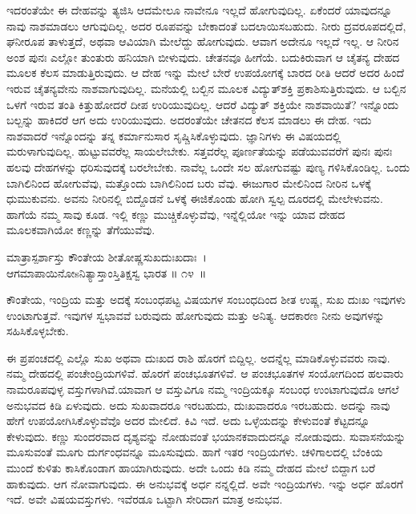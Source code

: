ಇದರಂತೆಯೇ ಈ ದೇಹವನ್ನು ತ್ಯಜಿಸಿ ಆದಮೇಲೂ ನಾವೇನೂ ಇಲ್ಲದೆ ಹೋಗುವುದಿಲ್ಲ. ಏಕೆಂದರೆ ಯಾವುದನ್ನೂ ನಾವು ನಾಶಮಾಡಲು ಆಗುವುದಿಲ್ಲ. ಅದರ ರೂಪವನ್ನು ಬೇಕಾದಂತೆ ಬದಲಾಯಿಸಬಹುದು. ನೀರು ದ್ರವರೂಪದಲ್ಲಿದೆ, ಘನೀರೂಪ ತಾಳುತ್ತದೆ, ಅಥವಾ ಆವಿಯಾಗಿ ಮೇಲೆದ್ದು ಹೋಗುವುದು. ಆವಾಗ ಅದೇನೂ ಇಲ್ಲದೆ ಇಲ್ಲ. ಆ ನೀರಿನ ಅಂಶ ಪುನಃ ಎಲ್ಲೋ ತುಂತುರು ಹನಿಯಾಗಿ ಬೀಳುವುದು. ಚೇತನವೂ ಹೀಗೆಯೆ. ಬದುಕಿರುವಾಗ ಆ ಚೈತನ್ಯ ದೇಹದ ಮೂಲಕ ಕೆಲಸ ಮಾಡುತ್ತಿರುವುದು. ಆ ದೇಹ ಇನ್ನು ಮೇಲೆ ಬೇರೆ ಉಪಯೋಗಕ್ಕೆ ಬಾರದ ರೀತಿ ಆದರೆ ಅದರ ಹಿಂದೆ ಇರುವ ಚೈತನ್ಯವೇನು ನಾಶವಾಗುವುದಿಲ್ಲ. ಮನೆಯಲ್ಲಿ ಬಲ್ಬಿನ ಮೂಲಕ ವಿದ್ಯುತ್​ಶಕ್ತಿ ಪ್ರಕಾಶಿಸುತ್ತಿರುವುದು. ಆ ಬಲ್ಬಿನ ಒಳಗೆ ಇರುವ ತಂತಿ ಕಿತ್ತುಹೋದರೆ ದೀಪ ಉರಿಯುವುದಿಲ್ಲ. ಆದರೆ ವಿದ್ಯುತ್ ಶಕ್ತಿಯೇ ನಾಶವಾಯಿತೆ? ಇನ್ನೊಂದು ಬಲ್ಬನ್ನು ಹಾಕಿದರೆ ಆಗ ಅದು ಉರಿಯುವುದು. ಅದರಂತೆಯೇ ಚೇತನದ ಕೆಲಸ ಮಾಡಲು ಈ ದೇಹ. ಇದು ನಾಶವಾದರೆ ಇನ್ನೊಂದನ್ನು ತನ್ನ ಕರ್ಮಾನುಸಾರ ಸೃಷ್ಚಿಸಿಕೊಳ್ಳುವುದು. ಜ್ಞಾನಿಗಳು ಈ ವಿಷಯದಲ್ಲಿ ಮರುಳಾಗುವುದಿಲ್ಲ. ಹುಟ್ಟುವವರೆಲ್ಲ ಸಾಯಲೇಬೇಕು. ಸತ್ತವರೆಲ್ಲ ಪೂರ್ಣತೆಯನ್ನು ಪಡೆಯುವವರೆಗೆ ಪುನಃ ಪುನಃ ಹಲವು ದೇಹಗಳನ್ನು ಧರಿಸುವುದಕ್ಕೆ ಬರಲೇಬೇಕು. ನಾವೆಲ್ಲ ಒಂದೇ ಸಲ ಹೋಗುವಷ್ಟು ಪುಣ್ಯ ಗಳಿಸಿಕೊಂಡಿಲ್ಲ. ಒಂದು ಬಾಗಿಲಿನಿಂದ ಹೋಗುವೆವು, ಮತ್ತೊಂದು ಬಾಗಿಲಿನಿಂದ ಬರು ವೆವು. ಈಜುಗಾರ ಮೇಲಿನಿಂದ ನೀರಿನ ಒಳಕ್ಕೆ ಧುಮುಕುವನು. ಅವನು ನೀರಿನಲ್ಲಿ ಬಿದ್ದೊಡನೆ ಒಳಕ್ಕೆ ಈಜಿಕೊಂಡು ಹೋಗಿ ಸ್ವಲ್ಪ ದೂರದಲ್ಲಿ ಮೇಲೇಳುವನು. ಹಾಗೆಯೆ ನಮ್ಮ ಸಾವು ಕೂಡ. ಇಲ್ಲಿ ಕಣ್ಣು ಮುಚ್ಚಿಕೊಳ್ಳುವೆವು, ಇನ್ನೆಲ್ಲಿಯೋ ಇನ್ನು ಯಾವ ದೇಹದ ಮೂಲಕವಾಗಿಯೋ ಕಣ್ಣನ್ನು ತೆಗೆಯುವೆವು.

\begin{shloka}
ಮಾತ್ರಾಸ್ಪರ್ಶಾಸ್ತು ಕೌಂತೇಯ ಶೀತೋಷ್ಣಸುಖದುಃಖದಾಃ~।\\ಆಗಮಾಪಾಯಿನೋsನಿತ್ಯಾಸ್ತಾಂಸ್ತಿತಿಕ್ಷಸ್ವ ಭಾರತ \hfill॥ ೧೪~॥
\end{shloka}

\begin{artha}
ಕೌಂತೇಯ, ಇಂದ್ರಿಯ ಮತ್ತು ಅದಕ್ಕೆ ಸಂಬಂಧಪಟ್ಟ ವಿಷಯಗಳ ಸಂಬಂಧದಿಂದ ಶೀತ ಉಷ್ಣ, ಸುಖ ದುಃಖ ಇವುಗಳು ಉಂಟಾಗುತ್ತವೆ. ಇವುಗಳ ಸ್ವಭಾವವೆ ಬರುವುದು ಹೋಗುವುದು ಮತ್ತು ಅನಿತ್ಯ. ಆದಕಾರಣ ನೀನು ಅವುಗಳನ್ನು ಸಹಿಸಿಕೊಳ್ಳಬೇಕು.
\end{artha}

ಈ ಪ್ರಪಂಚದಲ್ಲಿ ಎಲ್ಲೊ ಸುಖ ಅಥವಾ ದುಃಖದ ರಾಶಿ ಹೊರಗೆ ಬಿದ್ದಿಲ್ಲ. ಅದನ್ನೆಲ್ಲ ಮಾಡಿಕೊಳ್ಳುವವರು ನಾವು. ನಮ್ಮ ದೇಹದಲ್ಲಿ ಪಂಚೇಂದ್ರಿಯಗಳಿವೆ. ಹೊರಗೆ ಪಂಚಭೂತಗಳಿವೆ. ಆ ಪಂಚಭೂತಗಳ ಸಂಯೋಗದಿಂದ ಹಲವಾರು ನಾಮರೂಪವುಳ್ಳ ವಸ್ತುಗಳಾಗಿವೆ.\break ಯಾವಾಗ ಆ ವಸ್ತುವಿಗೂ ನಮ್ಮ ಇಂದ್ರಿಯಕ್ಕೂ ಸಂಬಂಧ ಉಂಟಾಗುವುದೊ ಆಗಲೆ ಅನುಭವದ ಕಿಡಿ ಏಳುವುದು. ಅದು ಸುಖವಾದರೂ ಇರಬಹುದು, ದುಃಖವಾದರೂ ಇರಬಹುದು. ಅದನ್ನು ನಾವು ಹೇಗೆ ಉಪಯೋಗಿಸಿಕೊಳ್ಳುವೆವೊ ಅದರ ಮೇಲಿದೆ. ಕಿವಿ ಇದೆ. ಅದು ಒಳ್ಳೆಯದನ್ನು ಕೇಳುವಂತೆ ಕೆಟ್ಟದನ್ನೂ ಕೇಳುವುದು. ಕಣ್ಣು ಸುಂದರವಾದ ದೃಶ್ಯವನ್ನು ನೋಡುವಂತೆ ಭಯಾನಕವಾದುದನ್ನೂ ನೋಡುವುದು. ಸುವಾಸನೆಯನ್ನು ಮೂಸುವಂತೆ ಮೂಗು ದುರ್ಗಂಧವನ್ನೂ ಮೂಸುವುದು. ಹಾಗೆ ಇತರ ಇಂದ್ರಿಯಗಳು. ಚಳಿಗಾಲದಲ್ಲಿ ಬೆಂಕಿಯ ಮುಂದೆ ಕುಳಿತು ಕಾಸಿಕೊಂಡಾಗ ಹಾಯಾಗಿರುವುದು. ಅದೇ ಒಂದು ಕಿಡಿ ನಮ್ಮ ದೇಹದ ಮೇಲೆ ಬಿದ್ದಾಗ ಬರೆ ಹಾಕುವುದು. ಆಗ ನೋವಾಗುವುದು. ಈ ಅನುಭವಕ್ಕೆ ಅರ್ಧ ನನ್ನಲ್ಲಿದೆ. ಅವೇ ಇಂದ್ರಿಯಗಳು. ಇನ್ನು ಅರ್ಧ ಹೊರಗೆ ಇದೆ. ಅವೇ ವಿಷಯವಸ್ತುಗಳು. ಇವೆರಡೂ ಒಟ್ಟಾಗಿ ಸೇರಿದಾಗ ಮಾತ್ರ ಅನುಭವ.

